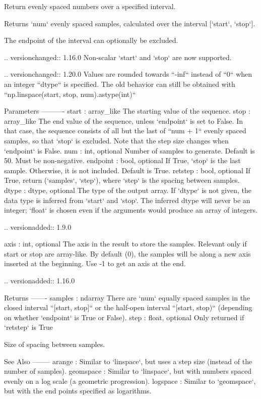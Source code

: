 \begin{DoxyVerb}Return evenly spaced numbers over a specified interval.

Returns `num` evenly spaced samples, calculated over the
interval [`start`, `stop`].

The endpoint of the interval can optionally be excluded.

.. versionchanged:: 1.16.0
    Non-scalar `start` and `stop` are now supported.

.. versionchanged:: 1.20.0
    Values are rounded towards ``-inf`` instead of ``0`` when an
    integer ``dtype`` is specified. The old behavior can
    still be obtained with ``np.linspace(start, stop, num).astype(int)``

Parameters
----------
start : array_like
    The starting value of the sequence.
stop : array_like
    The end value of the sequence, unless `endpoint` is set to False.
    In that case, the sequence consists of all but the last of ``num + 1``
    evenly spaced samples, so that `stop` is excluded.  Note that the step
    size changes when `endpoint` is False.
num : int, optional
    Number of samples to generate. Default is 50. Must be non-negative.
endpoint : bool, optional
    If True, `stop` is the last sample. Otherwise, it is not included.
    Default is True.
retstep : bool, optional
    If True, return (`samples`, `step`), where `step` is the spacing
    between samples.
dtype : dtype, optional
    The type of the output array.  If `dtype` is not given, the data type
    is inferred from `start` and `stop`. The inferred dtype will never be
    an integer; `float` is chosen even if the arguments would produce an
    array of integers.

    .. versionadded:: 1.9.0

axis : int, optional
    The axis in the result to store the samples.  Relevant only if start
    or stop are array-like.  By default (0), the samples will be along a
    new axis inserted at the beginning. Use -1 to get an axis at the end.

    .. versionadded:: 1.16.0

Returns
-------
samples : ndarray
    There are `num` equally spaced samples in the closed interval
    ``[start, stop]`` or the half-open interval ``[start, stop)``
    (depending on whether `endpoint` is True or False).
step : float, optional
    Only returned if `retstep` is True

    Size of spacing between samples.


See Also
--------
arange : Similar to `linspace`, but uses a step size (instead of the
         number of samples).
geomspace : Similar to `linspace`, but with numbers spaced evenly on a log
            scale (a geometric progression).
logspace : Similar to `geomspace`, but with the end points specified as
           logarithms.


\end{DoxyVerb}

